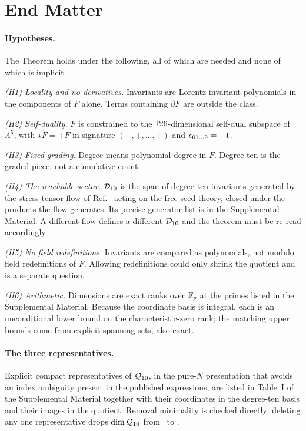 \onecolumngrid
\section*{End Matter}
\twocolumngrid

\paragraph*{Hypotheses.}
The Theorem holds under the following, all of which are needed and none of which
is implicit.

\emph{(H1) Locality and no derivatives.} Invariants are Lorentz-invariant
polynomials in the components of $F$ alone. Terms containing $\partial F$ are
outside the class.

\emph{(H2) Self-duality.} $F$ is constrained to the $126$-dimensional
self-dual subspace of $\Lambda^5$, with $\star F = +F$ in signature
$(-,+,\dots,+)$ and $\epsilon_{01\ldots9}=+1$.

\emph{(H3) Fixed grading.} Degree means polynomial degree in $F$. Degree ten is
the graded piece, not a cumulative count.

\emph{(H4) The reachable sector.} $\mathcal{D}_{10}$ is the span of degree-ten invariants
generated by the stress-tensor flow of Ref.~\cite{Hutomo:2025chiral} acting on the
free seed theory, closed under the products the flow generates. Its precise
generator list is in the Supplemental Material. A different flow defines a
different $\mathcal{D}_{10}$ and the theorem must be re-read accordingly.

\emph{(H5) No field redefinitions.} Invariants are compared as polynomials, not
modulo field redefinitions of $F$. Allowing redefinitions could only shrink the
quotient and is a separate question.

\emph{(H6) Arithmetic.} Dimensions are exact ranks over $\mathbb{F}_p$ at the primes
listed in the Supplemental Material. Because the coordinate basis is integral,
each is an unconditional lower bound on the characteristic-zero rank; the
matching upper bounds come from explicit spanning sets, also exact.

\paragraph*{The three representatives.}
Explicit compact representatives of $\mathcal{Q}_{10}$, in the pure-$N$ presentation that
avoids an index ambiguity present in the published expressions, are listed in
Table~I of the Supplemental Material together with their coordinates in the
degree-ten basis and their images in the quotient. Removal minimality is checked
directly: deleting any one representative drops $\dim\mathcal{Q}_{10}$ from \dimQten\ to
\dimQtenMinusOne.

